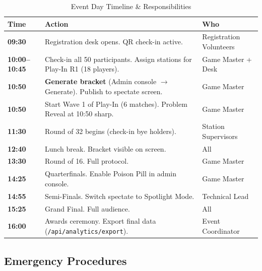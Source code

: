 \documentclass[11pt, a4paper]{article}
\begin{document}
\begin{table}[H]
\centering
\small\renewcommand{\arraystretch}{1.3}
\begin{tabularx}{\textwidth}{>{\bfseries}l l X}
\toprule
Time & Action & Who \\
\midrule
09:30      & Registration desk opens. QR check-in active. & Registration Volunteers \\
10:00--10:45 & Check-in all 50 participants. Assign stations for Play-In R1 (18 players). & Game Master + Desk \\
10:50      & \textbf{Generate bracket} (Admin console $\to$ Generate). Publish to spectate screen. & Game Master \\
10:50      & Start Wave 1 of Play-In (6 matches). Problem Reveal at 10:50 sharp. & Game Master \\
11:30      & Round of 32 begins (check-in bye holders). & Station Supervisors \\
12:40      & Lunch break. Bracket visible on screen. & All \\
13:30      & Round of 16. Full protocol. & Game Master \\
14:25      & Quarterfinals. Enable Poison Pill in admin console. & Game Master \\
14:55      & Semi-Finals. Switch spectate to Spotlight Mode. & Technical Lead \\
15:25      & Grand Final. Full audience. & All \\
16:00      & Awards ceremony. Export final data (\texttt{/api/analytics/export}). & Event Coordinator \\
\bottomrule
\end{tabularx}
\caption{Event Day Timeline \& Responsibilities}
\end{table}

\subsection{Emergency Procedures}
\end{document}
